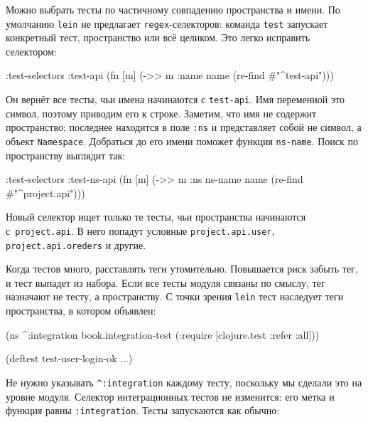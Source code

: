 Можно выбрать тесты по частичному совпадению пространства и имени. По умолчанию
\verb|lein| не предлагает \verb|regex|-селекторов: команда \verb|test| запускает
конкретный тест, пространство или всё целиком. Это легко исправить селектором:

\begin{english}
  \begin{clojure}
:test-selectors {:test-api
                 (fn [m] (->> m :name name
                              (re-find #"^test-api")))}
  \end{clojure}
\end{english}

Он вернёт все тесты, чьи имена начинаются с \verb|test-api|. Имя переменной это
символ, поэтому приводим его к строке. Заметим, что имя не содержит
пространство; последнее находится в поле \verb|:ns| и представляет собой не
символ, а объект \verb|Namespace|. Добраться до его имени поможет функция
\verb|ns-name|. Поиск по пространству выглядит так:


\begin{english}
  \begin{clojure}
:test-selectors {:test-ns-api
                 (fn [m] (->> m :ns ns-name name
                              (re-find #"^project.api")))}
  \end{clojure}
\end{english}

Новый селектор ищет только те тесты, чьи пространства начинаются
с~\verb|project.api|. В него попадут условные \verb|project.api.user|,
\verb|project.api.oreders| и другие.

Когда тестов много, расставлять теги утомительно. Повышается риск забыть тег, и
тест выпадет из набора. Если все тесты модуля связаны по смыслу, тег назначают
не тесту, а пространству. С точки зрения \verb|lein| тест наследует теги
пространства, в котором объявлен:

\begin{english}
  \begin{clojure}
(ns ^:integration
  book.integration-test
  (:require [clojure.test :refer :all]))

(deftest test-user-login-ok
  ...)
  \end{clojure}
\end{english}

Не нужно указывать \verb|^:integration| каждому тесту, поскольку мы сделали
это на уровне модуля. Селектор интеграционных тестов не изменится: его метка и
функция равны \verb|:integration|. Тесты запускаются как обычно:

